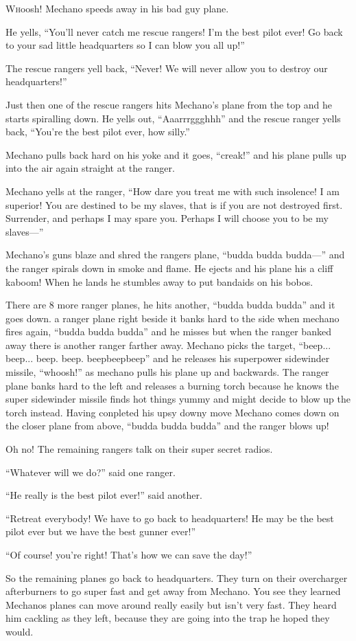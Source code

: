 \lettrine[lines=2,lraise=0]{W}hoosh! Mechano speeds away in his bad guy plane. 

He yells, ``You'll never catch me rescue rangers! I'm the best pilot ever! Go back to your sad little headquarters so I can blow you all up!''

The rescue rangers yell back, ``Never! We will never allow you to destroy our headquarters!''

Just then one of the rescue rangers hits Mechano's plane from the top and he starts spiralling down. He yells out, ``Aaarrrggghhh'' and the rescue ranger yells back, ``You're the best pilot ever, how silly.''

Mechano pulls back hard on his yoke and it goes, ``creak!'' and his plane pulls up into the air again straight at the ranger.

Mechano yells at the ranger, ``How dare you treat me with such insolence! I am superior! You are destined to be my slaves, that is if you are not destroyed first. Surrender, and perhaps I may spare you. Perhaps I will choose you to be my slaves---''

Mechano's guns blaze and shred the rangers plane, ``budda budda budda---'' and the ranger spirals down in smoke and flame. He ejects and his plane his a cliff kaboom! When he lands he stumbles away to put bandaids on his bobos.

There are 8 more ranger planes, he hits another, ``budda budda budda'' and it goes down. a ranger plane right beside it banks hard to the side when mechano fires again, ``budda budda budda'' and he misses but when the ranger banked away there is another ranger farther away. Mechano picks the target, ``beep... beep... beep. beep. beepbeepbeep'' and he releases his superpower sidewinder missile, ``whoosh!'' as mechano pulls his plane up and backwards. The ranger plane banks hard to the left and releases a burning torch because he knows the super sidewinder missile finds hot things yummy and might decide to blow up the torch instead. Having conpleted his upsy downy move Mechano comes down on the closer plane from above, ``budda budda budda'' and the ranger blows up! 

Oh no! The remaining rangers talk on their super secret radios.

``Whatever will we do?'' said one ranger.

``He really is the best pilot ever!'' said another.

``Retreat everybody! We have to go back to headquarters! He may be the best pilot ever but we have the best gunner ever!''

``Of course! you're right! That's how we can save the day!''

So the remaining planes go back to headquarters. They turn on their overcharger afterburners to go super fast and get away from Mechano. You see they learned Mechanos planes can move around really easily but isn't very fast. They heard him cackling as they left, because they are going into the trap he hoped they would.